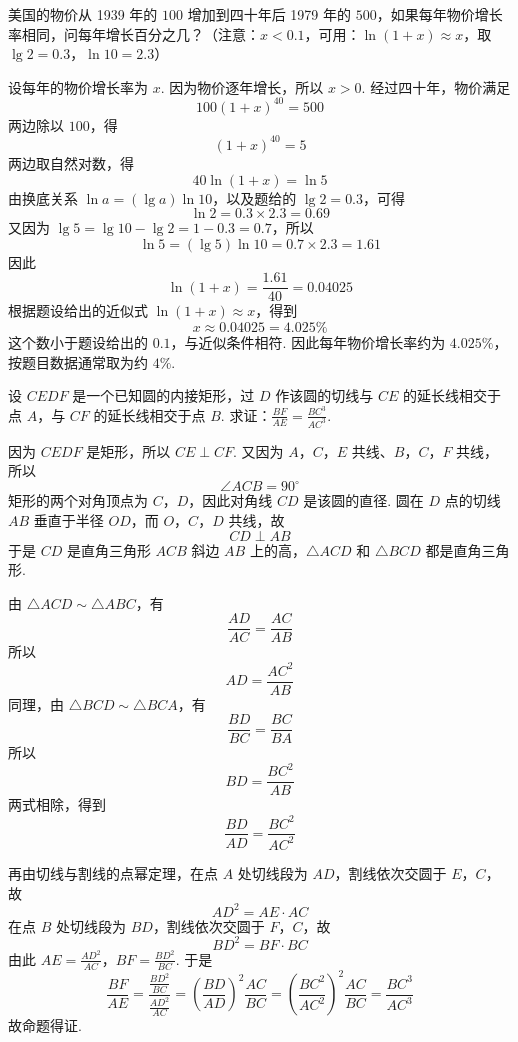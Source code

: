 \documentclass[UTF8,a4paper,oneside,11pt]{ctexbook}
\begin{document}
\begin{problem}
美国的物价从 1939 年的 \(100\) 增加到四十年后 1979 年的 \(500\)，如果每年物价增长率相同，问每年增长百分之几？（注意：\(x < 0.1\)，可用：\(\ln\left(1+x\right) \approx x\)，取 \(\lg 2 = 0.3\)，\(\ln 10 = 2.3\)）
\end{problem}

\begin{solution}
设每年的物价增长率为 \(x\). 因为物价逐年增长，所以 \(x>0\). 经过四十年，物价满足
\[
100(1+x)^{40}=500
\]
两边除以 \(100\)，得
\[
\left(1+x\right)^{40}=5
\]
两边取自然对数，得
\[
40\ln\left(1+x\right)=\ln5
\]
由换底关系 \(\ln a=(\lg a)\ln10\)，以及题给的 \(\lg2=0.3\)，可得
\[
\ln2=0.3\times2.3=0.69
\]
又因为 \(\lg5=\lg10-\lg2=1-0.3=0.7\)，所以
\[
\ln5=(\lg5)\ln10=0.7\times2.3=1.61
\]
因此
\[
\ln\left(1+x\right)=\frac{1.61}{40}=0.04025
\]
根据题设给出的近似式 \(\ln(1+x)\approx x\)，得到
\[
x\approx0.04025=4.025\%
\]
这个数小于题设给出的 \(0.1\)，与近似条件相符. 因此每年物价增长率约为 \(4.025\%\)，按题目数据通常取为约 \(4\%\).
\end{solution}

\begin{problem}
设 \(CEDF\) 是一个已知圆的内接矩形，过 \(D\) 作该圆的切线与 \(CE\) 的延长线相交于点 \(A\)，与 \(CF\) 的延长线相交于点 \(B\). 求证：\(\frac{BF}{AE} = \frac{BC^{3}}{AC^{3}}\).

\FloatBarrier
\end{problem}

\begin{solution}
因为 \(CEDF\) 是矩形，所以 \(CE\perp CF\). 又因为 \(A\)，\(C\)，\(E\) 共线、\(B\)，\(C\)，\(F\) 共线，所以
\[
\angle ACB=90^{\circ}
\]
矩形的两个对角顶点为 \(C\)，\(D\)，因此对角线 \(CD\) 是该圆的直径. 圆在 \(D\) 点的切线 \(AB\) 垂直于半径 \(OD\)，而 \(O\)，\(C\)，\(D\) 共线，故
\[
CD\perp AB
\]
于是 \(CD\) 是直角三角形 \(ACB\) 斜边 \(AB\) 上的高，\(\triangle ACD\) 和 \(\triangle BCD\) 都是直角三角形.

由 \(\triangle ACD\sim\triangle ABC\)，有
\[
\frac{AD}{AC}=\frac{AC}{AB}
\]
所以
\[
AD=\frac{AC^2}{AB}
\]
同理，由 \(\triangle BCD\sim\triangle BCA\)，有
\[
\frac{BD}{BC}=\frac{BC}{BA}
\]
所以
\[
BD=\frac{BC^2}{AB}
\]
两式相除，得到
\[
\frac{BD}{AD}=\frac{BC^2}{AC^2}
\]

再由切线与割线的点幂定理，在点 \(A\) 处切线段为 \(AD\)，割线依次交圆于 \(E\)，\(C\)，故
\[
AD^2=AE\cdot AC
\]
在点 \(B\) 处切线段为 \(BD\)，割线依次交圆于 \(F\)，\(C\)，故
\[
BD^2=BF\cdot BC
\]
由此
\(AE=\frac{AD^2}{AC}\)，\(BF=\frac{BD^2}{BC}\).
于是
\[
\frac{BF}{AE}
=\frac{\frac{BD^2}{BC}}{\frac{AD^2}{AC}}
=\left(\frac{BD}{AD}\right)^2\frac{AC}{BC}
=\left(\frac{BC^2}{AC^2}\right)^2\frac{AC}{BC}
=\frac{BC^3}{AC^3}
\]
故命题得证.
\end{solution}
\end{document}
